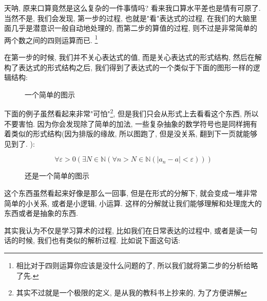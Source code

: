 天呐, 原来口算竟然是这么复杂的一件事情吗? 看来我口算水平差也是情有可原了. 当然不是, 我们会发现, 第一步的过程, 也就是"看"表达式的过程, 在我们的大脑里面几乎是潜意识一般自动地处理的, 而第二步的算值的过程, 则不过是非常简单的两个数之间的四则运算而已. \footnote{相比对于四则运算你应该是没什么问题的了, 所以我们就将第二步的分析给略了先. }

在第一步的时候, 我们并不关心表达式的值, 而是关心表达式的形式结构, 然后在解构了表达式的形式结构之后, 我们得到了表达式的一个类似于下面的图形一样的逻辑结构: 

\begin{figure}[h]
  \centering
  \caption{一个简单的图示}
\end{figure}

下面的例子虽然看起来非常"可怕"\footnote{其实不过就是一个极限的定义, 是从我的教科书上抄来的, 为了方便讲解}, 但是我们只会从形式上去看看这个东西, 所以不要害怕. 因为你会发现除了简单的加法, 一些复杂抽象的数学符号也是同样拥有着类似的形式结构(因为排版的缘故, 所以图跑了, 但是没关系, 翻到下一页就能够见到了. ): 

$$\forall \varepsilon > 0 (\exists N \in \mathbb{N} (\forall n > N \in \mathbb{N} (\vert a_n - a \vert < \varepsilon)))$$

\begin{figure}[h]
  \centering
  \caption{还是一个简单的图示}
\end{figure}

这个东西虽然看起来好像是那么一回事, 但是在形式的分解下, 就会变成一堆非常简单的小关系, 或者是小逻辑, 小运算. 这样的分解就让我们能够理解和处理庞大的东西或者是抽象的东西. 

其实我认为不仅是学习算术的过程, 比如我们在日常表达的过程中, 或者是读一句话的时候, 我们也有类似的解析过程. 比如说下面这句话: 

